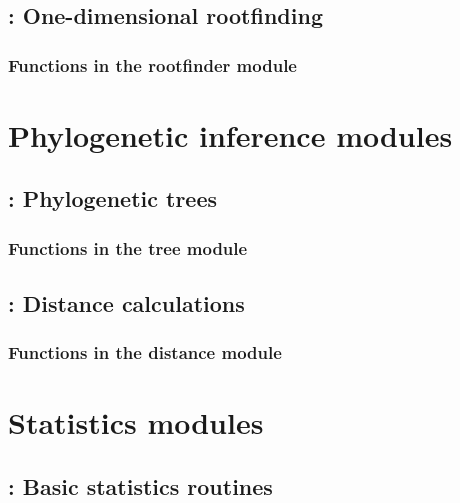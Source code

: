 \documentclass[10pt]{book}
\begin{document}
\newpage
\section{: One-dimensional rootfinding}

\subsection{Functions in the rootfinder module}


\chapter{Phylogenetic inference modules}

\newpage
\section{: Phylogenetic trees}

\subsection{Functions in the tree module}


\newpage
\section{: Distance calculations}

\subsection{Functions in the distance module}







\newpage
\chapter{Statistics modules}


\newpage
\section{: Basic statistics routines}

\end{document}

